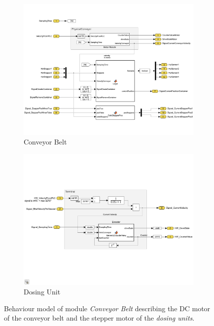 	\begin{figure}[htp]
		\centering
		\begin{subfigure}{.95\textwidth}
			\centering
            \includegraphics[trim=0mm 20mm 0mm 20mm, clip, width=0.95\linewidth]{figures/BehaviourModelConveyor.pdf}
			\caption{Conveyor Belt}
		\end{subfigure}
		\vspace{3mm}
		
		\begin{subfigure}{.85\textwidth}
			\centering
            \includegraphics[trim=0mm 55mm 0mm 55mm, clip, width=0.95\linewidth]{figures/BehaviourModelDosingUnit.pdf}
			\caption{Dosing Unit}
		\end{subfigure}
		\caption[Behaviour model of module \textit{Conveyor Belt}.] {Behaviour model of module \textit{Conveyor Belt} describing the DC motor of the conveyor belt and the stepper motor of the \textit{dosing units}. }
		\label{fig:ExampleFillingModelDrive}
	\end{figure}
	
